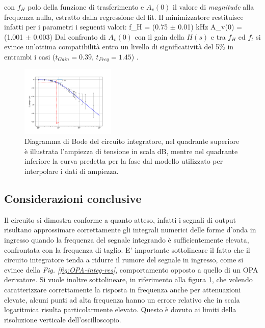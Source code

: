 \documentclass[journal]{IEEEtran}
\begin{document}
con $f_H$ polo della funzione di trasferimento e $A_v(0)$ il valore di \textit{magnitude} alla frequenza nulla, estratto dalla regressione del fit. Il minimizzatore restituisce infatti per i parametri i seguenti valori:  f_H = (0.75 $\pm$ 0.01) kHz A_v(0) = (1.001 $\pm$ 0.003)
Dal confronto di $A_v(0)$ con il gain della $H(s)$ e tra $f_H$ ed $f_t$ si evince un'ottima compatibilità entro un livello di significatività del 5\% in entrambi i casi ($t_{Gain} = 0.39 $, $t_{Freq} = 1.45 $) .

\begin{figure}[H]%
\begin{center}
\includegraphics[width=0.40\textwidth]{analysis/output/OPA-integrator_bode(mag+phase).pdf}
\caption{Diagramma di Bode del circuito integratore, nel quadrante superiore è illustrata l'ampiezza di tensione in scala dB, mentre nel quadrante inferiore la curva predetta per la fase dal modello utilizzato per interpolare i dati di ampiezza.}
\label{fig:integ-bode}
\end{center}
\end{figure}


\subsection{\textbf{Considerazioni conclusive}}
Il circuito si dimostra conforme a quanto atteso, infatti i segnali di output risultano approssimare correttamente gli integrali numerici delle forme d'onda in ingresso quando la frequenza del segnale integrando è sufficientemente elevata, confrontata con la frequenza di taglio. E' importante sottolineare il fatto che il circuito integratore tenda a ridurre il rumore del segnale in ingresso, come si evince della \textit{Fig. \ref{fig:OPA-integ-res}}, comportamento opposto a quello di un OPA derivatore. Si vuole inoltre sottolineare, in riferimento alla figura \ref{fig:integ-bode}, che volendo caratterizzare correttamente la risposta in frequenza anche per attenuazioni elevate, alcuni punti ad alta frequenza hanno un errore relativo che in scala logaritmica risulta particolarmente elevato. Questo è dovuto ai limiti della risoluzione verticale dell'oscilloscopio.
\end{document}
